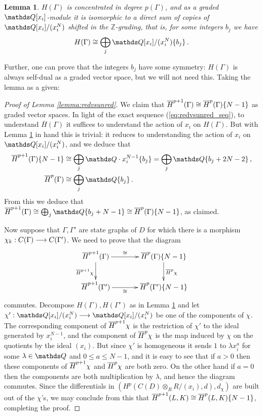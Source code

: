 \documentclass{compositio}
\newtheorem{lemma}[theorem]{Lemma}
\theoremstyle{definition}
\numberwithin{equation}{section}
\begin{document}
\begin{lemma}\label{lemma:directsumalgebras} $H(\Gamma)$ is concentrated in degree $p(\Gamma)$, and as a graded $\QQ[x_i]$-module it is isomorphic to a direct sum of copies of $\QQ[x_i]/(x_i^N)$ shifted in the $\mathds{Z}$-grading, that is, for some integers $b_j$ we have
\[
H(\Gamma) \cong \bigoplus_{j} \QQ[x_i]/(x_i^N)\{b_j\} \, .
\]
\end{lemma}

Further, one can prove that the integers $b_j$ have some symmetry: $H(\Gamma)$ is always self-dual as a graded vector space, but we will not need this. Taking the lemma as a given:

\begin{proof}[Proof of Lemma \ref{lemma:redvsunred}] We claim that $\overline{H}^{p+1}(\Gamma) \cong \overline{H}^p(\Gamma)\{N-1\}$ as graded vector spaces. In light of the exact sequence (\ref{eq:redvsunred_seq}), to understand $\overline{H}(\Gamma)$ it suffices to understand the action of $x_i$ on $H(\Gamma)$. But with Lemma \ref{lemma:directsumalgebras} in hand this is trivial: it reduces to understanding the action of $x_i$ on $\QQ[x_i]/(x_i^N)$, and we deduce that
\begin{align*}
\redh^{p+1}(\Gamma)\{N-1\} &\cong \bigoplus_j \QQ \cdot x_i^{N-1} \{ b_j \} = \bigoplus_j \QQ\{b_j + 2N - 2 \} \, ,\\
\redh^p(\Gamma) &\cong \bigoplus_j \QQ \{ b_j \}\,.
\end{align*}
From this we deduce that $\redh^{p+1}(\Gamma) \cong \bigoplus_j \QQ\{b_j + N - 1 \} \cong \redh^p(\Gamma)\{N-1\}$, as claimed.

Now suppose that $\Gamma, \Gamma'$ are state graphs of $D$ for which there is a morphism $\chi_k: C(\Gamma) \longrightarrow C(\Gamma')$. We need to prove that the diagram
\[
\xymatrix@C+1pc{
\redh^{p+1}(\Gamma) \ar[d]_{\redh^{p+1}\chi}\ar[r]^-{\cong} & \redh^p(\Gamma)\{N-1\}\ar[d]^{\redh^p \chi}\\
\redh^{p+1}(\Gamma') \ar[r]_-{\cong} & \redh^p(\Gamma')\{N-1\}
}
\]
commutes. Decompose $H(\Gamma), H(\Gamma')$ as in Lemma \ref{lemma:directsumalgebras} and let $\chi': \QQ[x_i]/(x_i^N) \lto \QQ[x_i]/(x_i^N)$ be one of the components of $\chi$. The corresponding component of $\overline{H}^{p+1} \chi$ is the restriction of $\chi'$ to the ideal generated by $x_i^{N-1}$, and the component of $\overline{H}^p \chi$ is the map induced by $\chi$ on the quotients by the ideal $(x_i)$. But since $\chi'$ is homogeneous it sends $1$ to $\lambda x_i^a$ for some $\lambda \in \QQ$ and $0 \le a \le N - 1$, and it is easy to see that if $a > 0$ then these components of $\overline{H}^{p+1} \chi$ and $\overline{H}^p \chi$ are both zero. On the other hand if $a = 0$ then the components are both multiplication by $\lambda$, and hence the diagram commutes. Since the differentials in $(H^p(C(D) \otimes_R R/(x_i),d), d_\chi)$ are built out of the $\chi$'s, we may conclude from this that $\overline{H}^{p+1}(L,K) \cong \overline{H}^{p}(L,K)\{N-1\}$, completing the proof.
\end{proof}
\end{document}
